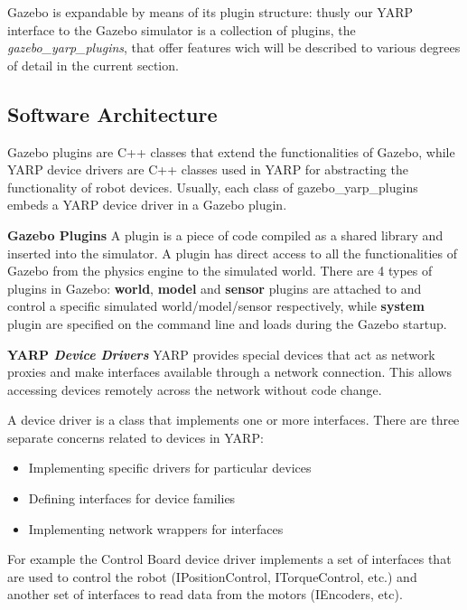 Gazebo is expandable by means of its plugin structure: thusly our YARP interface to the Gazebo simulator is a collection of plugins, the \emph{gazebo\_yarp\_plugins}, that offer features wich will be described to various degrees of detail in the current section. 


\subsection{Software Architecture}\label{structure}
Gazebo plugins are C++ classes that extend the functionalities of Gazebo, while YARP device drivers are C++ classes used in YARP for abstracting the functionality of robot devices.
Usually, each class of gazebo\_yarp\_plugins embeds a YARP device driver in a Gazebo plugin. 

{\bf Gazebo Plugins}
A plugin is a piece of code compiled as a shared library and inserted into the simulator. A plugin has direct access to all the functionalities of Gazebo from the physics engine to the simulated world. There are 4 types of plugins in Gazebo: \textbf{world}, \textbf{model} and \textbf{sensor} plugins are attached to and control a specific simulated world/model/sensor respectively, while \textbf{system} plugin are specified on the command line and loads during the Gazebo startup.


{\bf YARP \emph{Device Drivers}}
YARP provides special devices that act as network proxies and make interfaces available through a network connection. This allows accessing devices remotely across the network without code change.

A device driver is a class that implements one or more interfaces. There are three separate concerns related to devices in YARP:
\begin{itemize}
\item Implementing specific drivers for particular devices
\item Defining interfaces for device families
\item Implementing network wrappers for interfaces
\end{itemize}
For example the Control Board device driver implements a set of interfaces that are used to control the robot (IPositionControl, ITorqueControl, etc.) and another set of interfaces to read data from the motors (IEncoders, etc).

